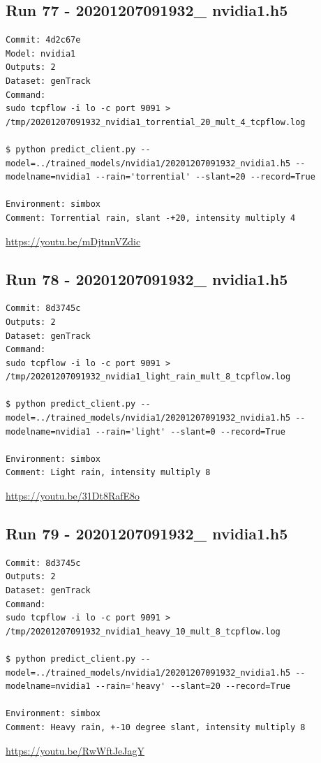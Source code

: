 \subsection{Run 77 - 20201207091932\_ nvidia1.h5 }
\label{app_res:77}
\begin{verbatim}
Commit: 4d2c67e
Model: nvidia1
Outputs: 2
Dataset: genTrack
Command:
sudo tcpflow -i lo -c port 9091 > /tmp/20201207091932_nvidia1_torrential_20_mult_4_tcpflow.log

$ python predict_client.py --model=../trained_models/nvidia1/20201207091932_nvidia1.h5 --modelname=nvidia1 --rain='torrential' --slant=20 --record=True

Environment: simbox
Comment: Torrential rain, slant -+20, intensity multiply 4
\end{verbatim}
\url{https://youtu.be/mDjtnnVZdic}

\subsection{Run 78 - 20201207091932\_ nvidia1.h5 }
\label{app_res:78}
\begin{verbatim}
Commit: 8d3745c 
Outputs: 2
Dataset: genTrack
Command:
sudo tcpflow -i lo -c port 9091 > /tmp/20201207091932_nvidia1_light_rain_mult_8_tcpflow.log

$ python predict_client.py --model=../trained_models/nvidia1/20201207091932_nvidia1.h5 --modelname=nvidia1 --rain='light' --slant=0 --record=True

Environment: simbox
Comment: Light rain, intensity multiply 8
\end{verbatim}
\url{https://youtu.be/31Dt8RafE8o}

\subsection{Run 79 - 20201207091932\_ nvidia1.h5 }
\label{app_res:79}
\begin{verbatim}
Commit: 8d3745c 
Outputs: 2
Dataset: genTrack
Command:
sudo tcpflow -i lo -c port 9091 > /tmp/20201207091932_nvidia1_heavy_10_mult_8_tcpflow.log

$ python predict_client.py --model=../trained_models/nvidia1/20201207091932_nvidia1.h5 --modelname=nvidia1 --rain='heavy' --slant=20 --record=True

Environment: simbox
Comment: Heavy rain, +-10 degree slant, intensity multiply 8
\end{verbatim}
\url{https://youtu.be/RwWftJeJagY}

